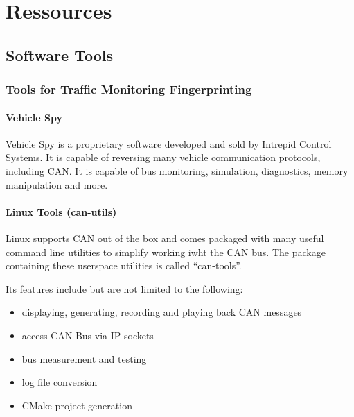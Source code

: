 \chapter{Ressources}
\section{Software Tools}
\subsection{Tools for Traffic Monitoring Fingerprinting}
\subsubsection{Vehicle Spy}
Vehicle Spy is a proprietary software developed and sold by Intrepid Control Systems. It is capable of reversing many vehicle communication protocols, including CAN. It is capable of bus monitoring, simulation, diagnostics, memory manipulation and more.

\subsubsection{Linux Tools (can-utils)}
Linux supports CAN out of the box and comes packaged with many useful command line utilities to simplify working iwht the CAN bus. The package containing these userspace utilities is called ``can-tools''.

Its features include but are not limited to the following:
\begin{itemize}
    \item displaying, generating, recording and playing back CAN messages
    \item access CAN Bus via IP sockets
    \item bus measurement and testing
    \item log file conversion
    \item CMake project generation
\end{itemize}


